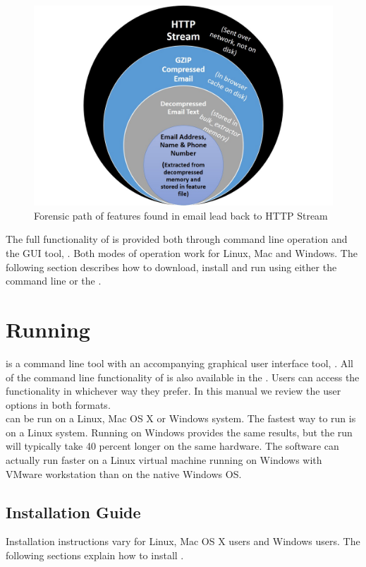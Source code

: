 \documentclass[11pt]{article} %
\begin{document}
\begin{figure}
	\center
	\includegraphics[scale=.60]{otherPics/forensicPath.jpg}
	\caption{Forensic path of features found in email lead back to HTTP Stream}
	\label{fig:forensicPath}
\end{figure}


The full functionality of \bulk is provided both through command line operation and the GUI tool, \viewer.  Both modes of operation work for Linux, Mac and Windows.  The following section describes how to download, install and run \bulk using either the command line or the \viewer.

\section{Running \bulk}
\bulk is a command line tool with an accompanying graphical user interface tool, \viewer. All of the command line functionality of \bulk is also available in the \viewer. Users can access the functionality in whichever way they prefer. In this manual we review the \bulk user options in both formats.\\

\bulk can be run on a Linux, Mac OS X or Windows system. The fastest way to run \bulk is on a Linux system. Running \bulk on Windows provides the same results, but the run will typically take 40 percent longer on the same hardware. The software can actually run faster on a Linux virtual machine running on Windows with VMware workstation than on the native Windows OS. 


\subsection{Installation Guide}
Installation instructions vary for Linux, Mac OS X users and Windows users. The following sections explain how to install \bulk.
\end{document}
